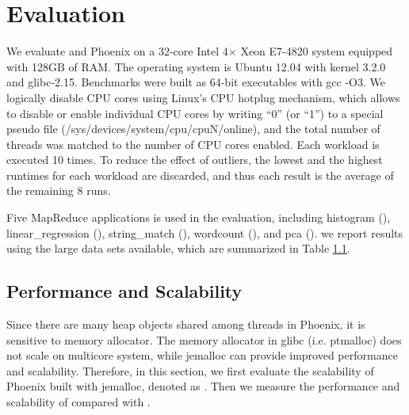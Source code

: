 \section{Evaluation}
\label{sec:eval}
We evaluate \myds and Phoenix on a 32-core Intel 4× Xeon E7-4820 system equipped with 128GB of RAM. 
The operating system is Ubuntu 12.04 with kernel 3.2.0 and glibc-2.15.
Benchmarks were built as 64-bit executables with gcc -O3.
We logically disable CPU cores using Linux’s CPU hotplug mechanism, which allows to disable or enable individual CPU cores by writing “0” (or “1”) to a special pseudo file (/sys/devices/system/cpu/cpuN/online), and the total number of threads was matched to the number of CPU cores enabled.
Each workload is executed 10 times. 
To reduce the effect of outliers, the lowest and the highest runtimes for each workload are discarded, and thus each result is the average of the remaining 8 runs.



Five MapReduce applications is used in the evaluation, including histogram (), linear\_regression (), string\_match (), wordcount (), and pca ().
we report results using the large data sets available, which are summarized in Table \ref{}.



\subsection{Performance and Scalability}
Since there are many heap objects shared among threads in Phoenix, it is sensitive to memory allocator\cite{yoo2009phoenix2}.
The memory allocator in glibc (i.e. ptmalloc\cite{gloger1997ptmalloc}) does not scale on multicore system, while jemalloc\cite{evans2006jemalloc} can provide improved performance and scalability. 
Therefore, in this section, we first evaluate the scalability of Phoenix built with jemalloc, denoted as .
Then we measure the performance and scalability of \myds compared with .


